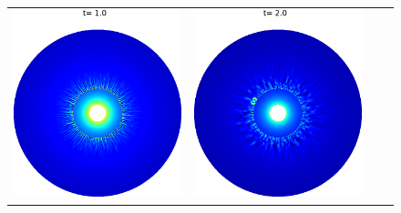 \documentclass[preprint, 11pt]{article}
\begin{document}
\begin{figure}[!h]
  \centering
  \begin{tabular}{cccc}
    \includegraphics[scale=0.24]{figures/chj_r2wp_blended_t1p0.png} &
    \includegraphics[scale=0.24]{figures/chj_r2wp_blended_t2p0.png} &

\end{tabular}
\end{figure}
\end{document}
